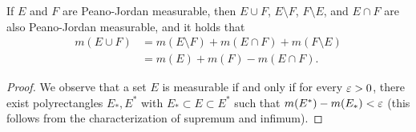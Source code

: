 \begin{theorem}
If $E$ and $F$ are Peano-Jordan measurable, then $E\cup F$, $E\setminus F$,
$F\setminus E$, and $E\cap F$ are also Peano-Jordan measurable, and it holds
that
\begin{align*}
  m(E\cup F)
  &= m(E\setminus F) + m(E\cap F) + m(F\setminus E)\\
  &= m(E) + m(F) - m(E\cap F).
\end{align*}
\end{theorem}
%
\begin{proof}
We observe that a set $E$ is measurable if and only if for every $\varepsilon>0$, there
exist polyrectangles $E_*, E^*$ with $E_* \subset E \subset E^*$ such that
$m(E^*)-m(E_*)<\varepsilon$ (this follows from the characterization of supremum and
infimum).


\end{proof}
